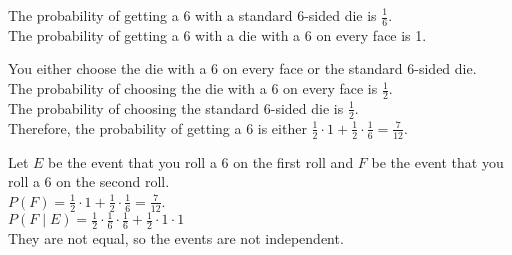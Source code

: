 \documentclass[12pt]{exam}
\begin{document}
\begin{solution}
	The probability of getting a 6 with a standard 6-sided die is $\frac{1}{6}$.\\
	The probability of getting a 6 with a die with a 6 on every face is 1.\\
	\begin{qparts}
		\item You either choose the die with a 6 on every face or the standard 6-sided die.\\
		The probability of choosing the die with a 6 on every face is $\frac{1}{2}$.\\
		The probability of choosing the standard 6-sided die is $\frac{1}{2}$.\\
		Therefore, the probability of getting a 6 is either $\frac{1}{2}\cdot 1 + \frac{1}{2}\cdot \frac{1}{6} = \frac{7}{12}$.\\

		\item Let $E$ be the event that you roll a 6 on the first roll and $F$ be the event that you roll a 6 on the second roll.\\
		$P(F) = \frac{1}{2}\cdot 1 + \frac{1}{2}\cdot \frac{1}{6} = \frac{7}{12}$.\\
		$P(F \mid E) = \frac{1}{2}\cdot \frac{1}{6} \cdot \frac{1}{6} + \frac{1}{2}\cdot 1 \cdot 1$\\
		They are not equal, so the events are not independent.
	\end{qparts}

\end{solution}
\end{document}
